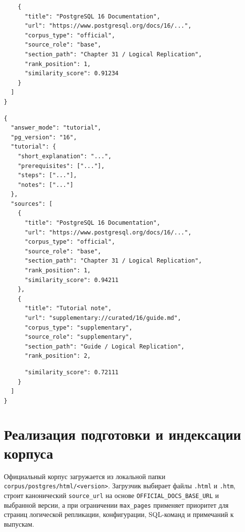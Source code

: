 \begin{listingblock}[24mm]
\begin{verbatim}
    {
      "title": "PostgreSQL 16 Documentation",
      "url": "https://www.postgresql.org/docs/16/...",
      "corpus_type": "official",
      "source_role": "base",
      "section_path": "Chapter 31 / Logical Replication",
      "rank_position": 1,
      "similarity_score": 0.91234
    }
  ]
}
\end{verbatim}
\end{listingblock}

\begin{listingblock}[24mm]
\label{listing:appendix-response-tutorial}
\begin{verbatim}
{
  "answer_mode": "tutorial",
  "pg_version": "16",
  "tutorial": {
    "short_explanation": "...",
    "prerequisites": ["..."],
    "steps": ["..."],
    "notes": ["..."]
  },
  "sources": [
    {
      "title": "PostgreSQL 16 Documentation",
      "url": "https://www.postgresql.org/docs/16/...",
      "corpus_type": "official",
      "source_role": "base",
      "section_path": "Chapter 31 / Logical Replication",
      "rank_position": 1,
      "similarity_score": 0.94211
    },
    {
      "title": "Tutorial note",
      "url": "supplementary://curated/16/guide.md",
      "corpus_type": "supplementary",
      "source_role": "supplementary",
      "section_path": "Guide / Logical Replication",
      "rank_position": 2,
\end{verbatim}
\end{listingblock}

\begin{listingblock}[35mm]
\begin{verbatim}
      "similarity_score": 0.72111
    }
  ]
}
\end{verbatim}
\end{listingblock}

\section{Реализация подготовки и индексации корпуса}

Официальный корпус загружается из локальной папки \texttt{corpus/postgres/html/<version>}. Загрузчик выбирает файлы \texttt{.html} и \texttt{.htm}, строит канонический \texttt{source\_url} на основе \texttt{OFFICIAL\_DOCS\_BASE\_URL} и выбранной версии, а при ограничении \texttt{max\_pages} применяет приоритет для страниц логической репликации, конфигурации, SQL-команд и примечаний к выпускам.

